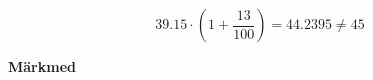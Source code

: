 \begin{center}
{{{\begin{flushleft}
\vspace{2mm}
\hspace{5mm}
\begin{equation}
\label{eq3_2}
39.15 \cdot \left( 1+\dfrac{13}{100} \right) = 44.2395 \neq 45
\end{equation}


\end{flushleft}
}}}
\end{center}

\textbf{Märkmed}\\
\vspace{2mm}
\begin{mdframed}[style=graphpaper]
\vspace{10cm}
\end{mdframed}